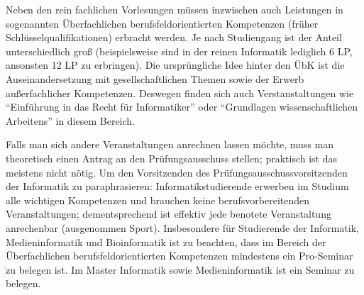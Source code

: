 Neben den rein fachlichen Vorlesungen m\"ussen inzwischen auch Leistungen in sogenannten \"Uberfachlichen berufsfeldorientierten Kompetenzen (fr\"uher Schl\"usselqualifikationen) erbracht 
werden. Je nach Studiengang ist der Anteil unterschiedlich gro\ss 
 (beispielsweise sind in der reinen Informatik lediglich 6 LP, ansonsten 12 LP zu erbringen). Die urspr\"ungliche Idee hinter den 
\"UbK ist die Auseinandersetzung mit gesellschaftlichen 
Themen sowie der Erwerb au\ss{}erfachlicher Kompetenzen. Deswegen finden sich 
auch Verstanstaltungen wie  "`Einf\"uhrung in das Recht f\"ur Informatiker"' 
oder "`Grundlagen wissenschaftlichen Arbeitens"' in diesem Bereich.

Falls man sich andere Veranstaltungen anrechnen lassen m\"ochte, muss man 
theoretisch einen Antrag an den Pr\"ufungsausschuss stellen; praktisch ist 
das meistens nicht n\"otig. Um den Vorsitzenden des 
Pr\"ufungsausschussvorsitzenden der Informatik zu paraphrasieren: 
Informatikstudierende erwerben im Studium alle wichtigen Kompetenzen und brauchen 
keine berufsvorbereitenden Veranstaltungen; dementsprechend ist effektiv jede 
benotete Veranstaltung anrechenbar (ausgenommen Sport). Insbesondere f\"ur 
Studierende der Informatik, Medieninformatik und Bioinformatik ist zu beachten, dass im Bereich der 
\"Uberfachlichen berufsfeldorientierten Kompetenzen mindestens ein Pro-Seminar zu belegen ist. Im Master 
Informatik sowie Medieninformatik ist ein Seminar zu belegen.

